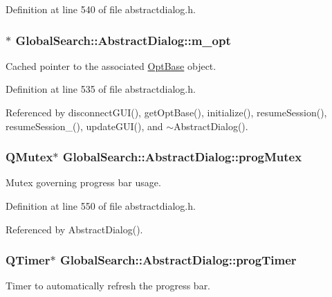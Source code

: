 Definition at line 540 of file abstractdialog.\-h.

\hypertarget{classGlobalSearch_1_1AbstractDialog_a6a5b08f59d1521ebc4769e9e9903346b}{
\subsubsection[{m\-\_\-opt}]{$\ast$ Global\-Search\-::\-Abstract\-Dialog\-::m\-\_\-opt\hspace{0.3cm}{\ttfamily [protected]}}}\label{classGlobalSearch_1_1AbstractDialog_a6a5b08f59d1521ebc4769e9e9903346b}
Cached pointer to the associated \hyperlink{classGlobalSearch_1_1OptBase}{Opt\-Base} object. 

Definition at line 535 of file abstractdialog.\-h.



Referenced by disconnect\-G\-U\-I(), get\-Opt\-Base(), initialize(), resume\-Session(), resume\-Session\-\_\-(), update\-G\-U\-I(), and $\sim$\-Abstract\-Dialog().

\hypertarget{classGlobalSearch_1_1AbstractDialog_a06e3b73c319208a706aaf629a5f05165}{
\subsubsection[{prog\-Mutex}]{\setlength{\rightskip}{0pt plus 5cm}Q\-Mutex$\ast$ Global\-Search\-::\-Abstract\-Dialog\-::prog\-Mutex\hspace{0.3cm}{\ttfamily [protected]}}}\label{classGlobalSearch_1_1AbstractDialog_a06e3b73c319208a706aaf629a5f05165}
Mutex governing progress bar usage. 

Definition at line 550 of file abstractdialog.\-h.



Referenced by Abstract\-Dialog().

\hypertarget{classGlobalSearch_1_1AbstractDialog_a1cf317e8206fd80628a9fe6d2ec711fc}{
\subsubsection[{prog\-Timer}]{\setlength{\rightskip}{0pt plus 5cm}Q\-Timer$\ast$ Global\-Search\-::\-Abstract\-Dialog\-::prog\-Timer\hspace{0.3cm}{\ttfamily [protected]}}}\label{classGlobalSearch_1_1AbstractDialog_a1cf317e8206fd80628a9fe6d2ec711fc}
Timer to automatically refresh the progress bar. 


